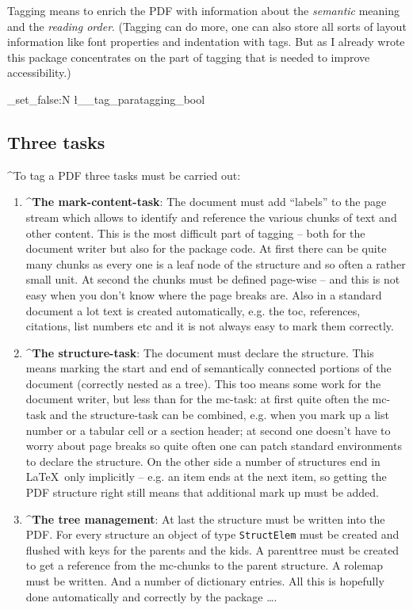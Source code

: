 \documentclass[DIV=12,parskip=half-,bibliography=totoc]{scrartcl}
\newcommand\PDF{PDF}
\newcommand\parataggingOff{\bool_set_false:N \l__tag_paratagging_bool}
\begin{document}
Tagging means to enrich the \PDF{} with information about the \emph{semantic} meaning and the \emph{reading order}. (Tagging can do more, one can also store all sorts of layout information like font properties and indentation with tags. But as I already wrote this package concentrates on the part of tagging that is needed to improve accessibility.)

\parataggingOff


\subsection{Three tasks}
\TagP^To tag a \PDF{} three tasks must be  carried out:\TagPend

\begin{enumerate}
\item
  \TagP^\textbf{The mark-content-task}: The document must add \enquote{labels} to the page stream which allows to identify and reference the various chunks of text and other content.  This is the most difficult part of tagging -- both for the document writer but also for the package code. At first there can be quite many chunks as every one is a leaf node of the structure and so often a rather small unit.  At second the chunks must be defined page-wise -- and this is not easy when you don't know where the page breaks are. Also in a standard document a lot text is created automatically, e.g. the toc, references, citations, list numbers etc and it is not always easy to mark them correctly.\Pmeti

\item
  \TagP^\textbf{The structure-task}:  The document must declare the structure. This means marking the start and end of semantically connected portions of the document (correctly nested as a tree). This too means some work for the document writer, but less than for the mc-task: at first quite often the mc-task and the structure-task can be combined, e.g. when you mark up a list number or a tabular cell or a section header; at second one doesn't have to worry about page breaks so quite often one can patch standard environments to declare the structure. On the other side a number of structures end in \LaTeX\ only implicitly -- e.g. an item ends at the next item, so getting the \PDF{} structure right still means that additional mark up must be added.
  \Pmeti

\item
 \TagP^\textbf{The tree management}: At last the structure must be written into the \PDF{}. For every structure an object of type \texttt{StructElem} must be  created and flushed with keys for the parents and the kids. A parenttree must be created to get a reference from the mc-chunks to the parent structure. A rolemap must be written. And a number of dictionary entries. All this is hopefully done automatically and correctly by the package \ldots.
 \Pmeti
\end{enumerate}
\end{document}
